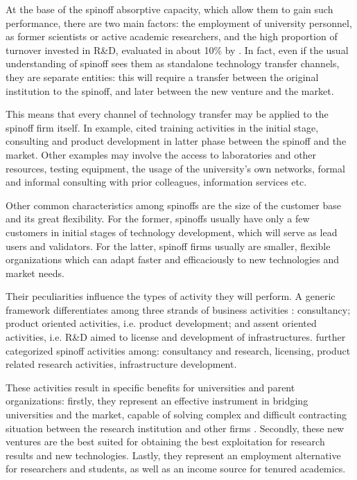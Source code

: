 At the base of the spinoff absorptive capacity, which allow them to gain such performance, there are two main factors: the employment of university personnel, as former scientists or active academic researchers, and the high proportion of turnover invested in R\&D, evaluated in about 10\% by \citet{Perez2003}. In fact, even if the usual understanding of spinoff sees them as standalone technology transfer channels, they are separate entities: this will require a transfer between the original institution to the spinoff, and later between the new venture and the market. 

This means that every channel of technology transfer may be applied to the spinoff firm itself. In example, \citet{Perez2003} cited training activities in the initial stage, consulting and product development in latter phase between the spinoff and the market. Other examples may involve the access to laboratories and other resources, testing equipment, the usage of the university's own networks, formal and informal consulting with prior colleagues, information services etc.

Other common characteristics among spinoffs are the size of the customer base and its great flexibility. For the former, spinoffs usually have only a few customers in initial stages of technology development, which will serve as lead users and validators. For the latter, spinoff firms usually are smaller, flexible organizations which can adapt faster and efficaciously to new technologies and market needs. 

Their peculiarities influence the types of activity they will perform. A generic framework differentiates among three strands of business activities \citep{Mustar2006}: consultancy; product oriented activities, i.e. product development; and assent oriented activities, i.e. R\&D aimed to license and development of infrastructures. \citet{Druilhe2004} further categorized spinoff activities among: consultancy and research, licensing, product related research activities, infrastructure development. 

These activities result in specific benefits for universities and parent organizations: firstly, they represent an effective instrument in bridging universities and the market, capable of solving complex and difficult contracting situation between the research institution and other firms \citep{Rizzo2015}. Secondly, these new ventures are the best suited for obtaining the best exploitation for research results and new technologies. Lastly, they represent an employment alternative for researchers and students, as well as an income source for tenured academics.

